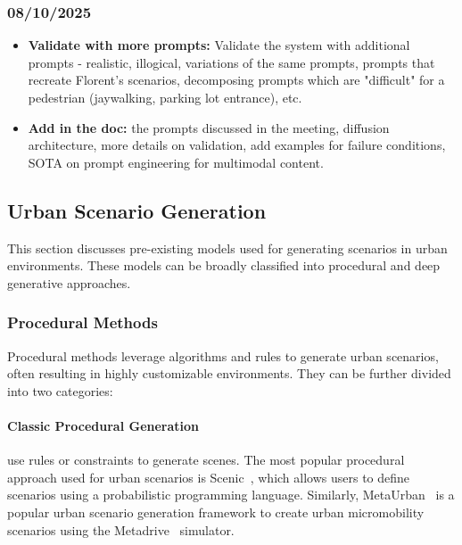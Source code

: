 \documentclass{article}
\begin{document}
\subsubsection{08/10/2025}    

\begin{itemize}

    \item \textbf{Validate with more prompts:} Validate the system with additional prompts - realistic, illogical, variations of the same prompts, prompts that recreate Florent's scenarios, decomposing prompts which are "difficult" for a pedestrian (jaywalking, parking lot entrance), etc.

    \item \textbf{Add in the doc:} the prompts discussed in the meeting, diffusion architecture, more details on validation, add examples for failure conditions, SOTA on prompt engineering for multimodal content.
    
\end{itemize}

\subsection{Urban Scenario Generation}

This section discusses pre-existing models used for generating scenarios in urban environments. These models can be broadly classified into procedural and deep generative approaches.

\subsubsection{Procedural Methods}

Procedural methods leverage algorithms and rules to generate urban scenarios, often resulting in highly customizable environments. They can be further divided into two categories:

\paragraph{Classic Procedural Generation} use rules or constraints to generate scenes. The most popular procedural approach used for urban scenarios is Scenic~\cite{fremont2019scenic}, which allows users to define scenarios using a probabilistic programming language. Similarly, MetaUrban~\cite{wu2024metaurban} is a popular urban scenario generation framework to create urban micromobility scenarios using the Metadrive~\cite{li2022metadrive} simulator.
\end{document}
